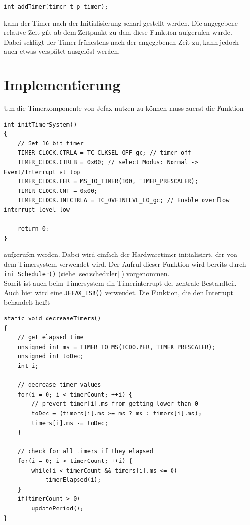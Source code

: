 \documentclass[fontsize=12pt, toc=bibliography, notitlepage]{scrreprt}
\newcommand{\refnn}[1]{\ref{#1} \nameref{#1}}
\begin{document}
\begin{lstlisting}[title=timer.h]
int addTimer(timer_t p_timer);
\end{lstlisting}

kann der Timer nach der Initialisierung scharf gestellt werden. Die angegebene relative Zeit gilt ab dem Zeitpunkt zu dem diese Funktion aufgerufen wurde. Dabei schlägt der Timer frühestens nach der angegebenen Zeit zu, kann jedoch auch etwas verspätet ausgelöst werden.

\section{Implementierung}
\label{sec:timer-impl}
Um die Timerkomponente von Jefax nutzen zu können muss zuerst die Funktion

\begin{lstlisting}[title=timer.c]
int initTimerSystem()
{
	// Set 16 bit timer
	TIMER_CLOCK.CTRLA = TC_CLKSEL_OFF_gc; // timer off
	TIMER_CLOCK.CTRLB = 0x00; // select Modus: Normal -> Event/Interrupt at top
	TIMER_CLOCK.PER = MS_TO_TIMER(100, TIMER_PRESCALER);
	TIMER_CLOCK.CNT = 0x00;
	TIMER_CLOCK.INTCTRLA = TC_OVFINTLVL_LO_gc; // Enable overflow interrupt level low
	
	return 0;
}
\end{lstlisting}

aufgerufen werden. Dabei wird einfach der Hardwaretimer initialisiert, der von dem Timersystem verwendet wird. Der Aufruf dieser Funktion wird bereits durch \lstinline$initScheduler()$ (siehe \refnn{sec:scheduler}) vorgenommen.\\
Somit ist auch beim Timersystem ein Timerinterrupt der zentrale Bestandteil. Auch hier wird eine \lstinline$JEFAX_ISR()$ verwendet. Die Funktion, die den Interrupt behandelt heißt

\begin{lstlisting}[title=timer.c]
static void decreaseTimers()
{
	// get elapsed time
	unsigned int ms = TIMER_TO_MS(TCD0.PER, TIMER_PRESCALER);
	unsigned int toDec;
	int i;
	
	// decrease timer values
	for(i = 0; i < timerCount; ++i) {
		// prevent timer[i].ms from getting lower than 0
		toDec = (timers[i].ms >= ms ? ms : timers[i].ms);
		timers[i].ms -= toDec;
	}
	
	// check for all timers if they elapsed
	for(i = 0; i < timerCount; ++i) {
		while(i < timerCount && timers[i].ms <= 0)
			timerElapsed(i);
	}
	if(timerCount > 0)
		updatePeriod();
}
\end{lstlisting}
\end{document}
